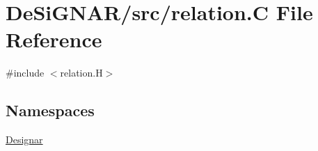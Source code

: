 \hypertarget{relation_8_c}{}\section{De\+Si\+G\+N\+A\+R/src/relation.C File Reference}
\label{relation_8_c}
{\ttfamily \#include $<$relation.\+H$>$}\newline
\subsection*{Namespaces}
\begin{DoxyCompactItemize}
\item 
 \hyperlink{namespace_designar}{Designar}
\end{DoxyCompactItemize}
